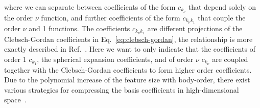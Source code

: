 where we can separate between coefficients of the form $c_{k_\nu}$ that depend solely on the order $\nu$ function, and further coefficients of the form $c_{k_\nu k_1}$ that couple the order $\nu$ and 1 functions.
The coefficients $c_{k_\nu k_1}$ are different projections of the Clebsch-Gordan coefficients in Eq.~\eqref{eq:clebsch-gordan}, the relationship is more exactly described in Ref.~\cite{niga+20jcp}.
Here we want to only indicate that the coefficients of order 1 $c_{k_1}$, the spherical expansion coefficients, and of order $\nu$ $c_{k_\nu}$ are coupled together with the Clebsch-Gordan coefficients to form higher order coefficients.
Due to the polynomial increase of the feature size with body-order, there exist various strategies for compressing the basis coefficients in high-dimensional space~\cite{kondor_clebsch_2018,yan2019fourier,niga+20jcp}.

%
%

